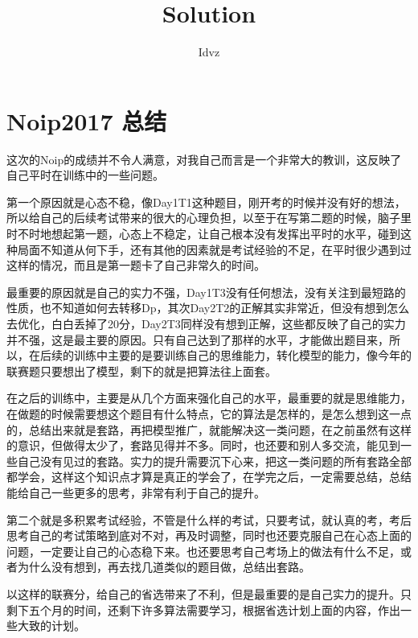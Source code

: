 \documentclass{ctexart}
\title{Solution}
\author{Idvz}
\begin{document}
\maketitle





\section{Noip2017 总结}
这次的Noip的成绩并不令人满意，对我自己而言是一个非常大的教训，这反映了自己平时在训练中的一些问题。

第一个原因就是心态不稳，像Day1T1这种题目，刚开考的时候并没有好的想法，所以给自己的后续考试带来的很大的心理负担，以至于在写第二题的时候，脑子里时不时地想起第一题，心态上不稳定，让自己根本没有发挥出平时的水平，碰到这种局面不知道从何下手，还有其他的因素就是考试经验的不足，在平时很少遇到过这样的情况，而且是第一题卡了自己非常久的时间。

最重要的原因就是自己的实力不强，Day1T3没有任何想法，没有关注到最短路的性质，也不知道如何去转移Dp，其次Day2T2的正解其实非常近，但没有想到怎么去优化，白白丢掉了20分，Day2T3同样没有想到正解，这些都反映了自己的实力并不强，这是最主要的原因。只有自己达到了那样的水平，才能做出题目来，所以，在后续的训练中主要的是要训练自己的思维能力，转化模型的能力，像今年的联赛题只要想出了模型，剩下的就是把算法往上面套。

在之后的训练中，主要是从几个方面来强化自己的水平，最重要的就是思维能力，在做题的时候需要想这个题目有什么特点，它的算法是怎样的，是怎么想到这一点的，总结出来就是套路，再把模型推广，就能解决这一类问题，在之前虽然有这样的意识，但做得太少了，套路见得并不多。同时，也还要和别人多交流，能见到一些自己没有见过的套路。实力的提升需要沉下心来，把这一类问题的所有套路全部都学会，这样这个知识点才算是真正的学会了，在学完之后，一定需要总结，总结能给自己一些更多的思考，非常有利于自己的提升。

第二个就是多积累考试经验，不管是什么样的考试，只要考试，就认真的考，考后思考自己的考试策略到底对不对，再及时调整，同时也还要克服自己在心态上面的问题，一定要让自己的心态稳下来。也还要思考自己考场上的做法有什么不足，或者为什么没有想到，再去找几道类似的题目做，总结出套路。

以这样的联赛分，给自己的省选带来了不利，但是最重要的是自己实力的提升。只剩下五个月的时间，还剩下许多算法需要学习，根据省选计划上面的内容，作出一些大致的计划。
\end{document}
